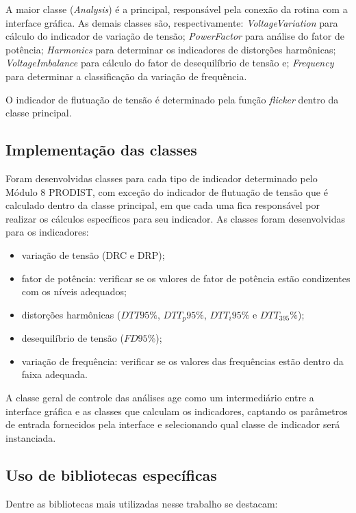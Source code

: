 A maior classe (\textit{Analysis}) é a principal, responsável pela conexão da rotina com a interface gráfica. As demais classes são, respectivamente: \textit{VoltageVariation} para cálculo do indicador de variação de tensão; \textit{PowerFactor} para análise do fator de potência; \textit{Harmonics} para determinar os indicadores de distorções harmônicas; \textit{VoltageImbalance} para cálculo do fator de desequilíbrio de tensão e; \textit{Frequency} para determinar a classificação da variação de frequência.

O indicador de flutuação de tensão é determinado pela função \textit{flicker} dentro da classe principal.

\subsection{Implementação das classes}

Foram desenvolvidas classes para cada tipo de indicador determinado pelo Módulo 8 PRODIST, com exceção do indicador de flutuação de tensão que é calculado dentro da classe principal, em que cada uma fica responsável por realizar os cálculos específicos para seu indicador. As classes foram desenvolvidas para os indicadores:

\begin{itemize}
  \item variação de tensão (DRC e DRP);
  \item fator de potência: verificar se os valores de fator de potência estão condizentes com os níveis adequados;
  \item distorções harmônicas ($DTT95\%$, $DTT_p95\%$, $DTT_i95\%$ e $DTT_395\%$);
  \item desequilíbrio de tensão ($FD95\%$);
  \item variação de frequência: verificar se os valores das frequências estão dentro da faixa adequada.
\end{itemize}

A classe geral de controle das análises age como um intermediário entre a interface gráfica e as classes que calculam os indicadores, captando os parâmetros de entrada fornecidos pela interface e selecionando qual classe de indicador será instanciada.

\subsection{Uso de bibliotecas específicas}

Dentre as bibliotecas mais utilizadas nesse trabalho se destacam:

